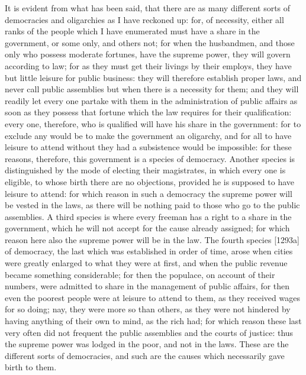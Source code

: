 It is evident from what has been said, that there are as many different
sorts of democracies and oligarchies as I have reckoned up: for, of
necessity, either all ranks of the people which I have enumerated must
have a share in the government, or some only, and others not; for when the
husbandmen, and those only who possess moderate fortunes, have the supreme
power, they will govern according to law; for as they must get their
livings by their employs, they have but little leisure for public
business: they will therefore establish proper laws, and never call public
assemblies but when there is a necessity for them; and they will readily
let every one partake with them in the administration of public affairs as
soon as they possess that fortune which the law requires for their
qualification: every one, therefore, who is qualified will have his share
in the government: for to exclude any would be to make the government an
oligarchy, and for all to have leisure to attend without they had a
subsistence would be impossible: for these reasons, therefore, this
government is a species of democracy. Another species is distinguished by
the mode of electing their magistrates, in which every one is eligible, to
whose birth there are no objections, provided he is supposed to have
leisure to attend: for which reason in such a democracy the supreme power
will be vested in the laws, as there will be nothing paid to those who go
to the public assemblies. A third species is where every freeman has a
right to a share in the government, which he will not accept for the cause
already assigned; for which reason here also the supreme power will be in
the law. The fourth species [1293a] of democracy, the last which was
established in order of time, arose when cities were greatly enlarged to
what they were at first, and when the public revenue became something
considerable; for then the populace, on account of their numbers, were
admitted to share in the management of public affairs, for then even the
poorest people were at leisure to attend to them, as they received wages
for so doing; nay, they were more so than others, as they were not
hindered by having anything of their own to mind, as the rich had; for
which reason these last very often did not frequent the public assemblies
and the courts of justice: thus the supreme power was lodged in the poor,
and not in the laws. These are the different sorts of democracies, and
such are the causes which necessarily gave birth to them.

